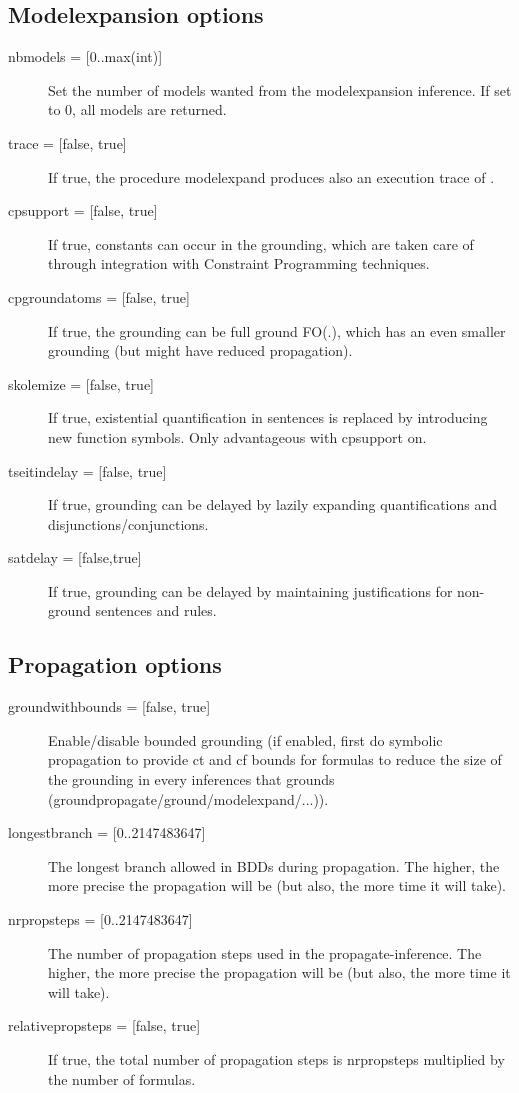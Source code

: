 \subsection{Modelexpansion options}
\begin{description}
	\item[{nbmodels = [0..max(int)]}] Set the number of models wanted from the modelexpansion inference.  If set to 0, all models are returned.
	\item[{trace = [false, true]}] If true, the procedure modelexpand produces also an execution trace of \minisatid.
	\item[{cpsupport = [false, true]}] If true, constants can occur in the grounding, which are taken care of through integration with Constraint Programming techniques. 
	\item[{cpgroundatoms = [false, true]}] If true, the grounding can be full ground FO(.), which has an even smaller grounding (but might have reduced propagation).
	\item[{skolemize = [false, true]}] If true, existential quantification in sentences is replaced by introducing new function symbols. Only advantageous with cpsupport on.
	\item[{tseitindelay = [false, true]}] If true, grounding can be delayed by lazily expanding quantifications and disjunctions/conjunctions.
	\item[{satdelay = [false,true]}] If true, grounding can be delayed by maintaining justifications for non-ground sentences and rules.
\end{description}

\subsection{Propagation options}
\begin{description}
	\item[{groundwithbounds = [false, true]}] Enable/disable bounded grounding (if enabled, first do symbolic propagation to provide ct and cf bounds for formulas to reduce the size of the grounding in every inferences that grounds (groundpropagate/ground/modelexpand/...)).
	\item[{longestbranch = [0..2147483647]}] The longest branch allowed in BDDs during propagation. The higher, the more precise the propagation will be (but also, the more time it will take).
	\item[{nrpropsteps = [0..2147483647]}] The number of propagation steps used in the propagate-inference. The higher, the more precise the propagation will be (but also, the more time it will take).
	\item[{relativepropsteps =  [false, true]}] If true, the total number of propagation steps is nrpropsteps multiplied by the number of formulas.

\end{description}

